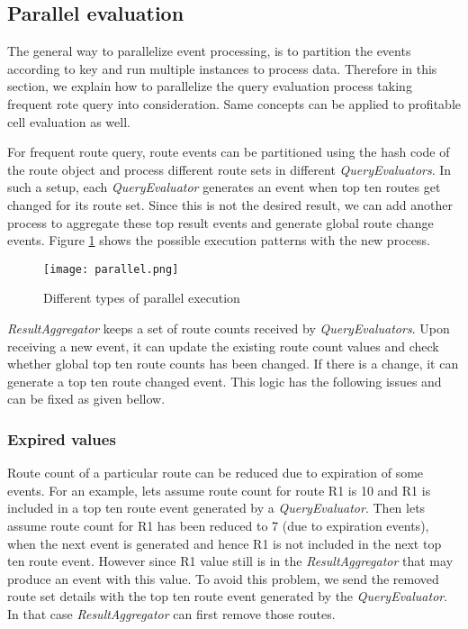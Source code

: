 \subsection{Parallel evaluation}
The general way to parallelize event processing, is to partition the events according to key and run multiple instances to process data. Therefore in this section, we explain how to parallelize the query evaluation process taking frequent rote query into consideration. Same concepts can be applied to profitable cell evaluation as well.

For frequent route query, route events can be partitioned using the hash code of the route object and process different route sets in different \textit{QueryEvaluators}. In such a setup, each \textit{QueryEvaluator} generates an event when top ten routes get changed for its route set. Since this is not the desired result, we can add another process to aggregate these top result events and generate global route change events. Figure \ref{parallel} shows the possible execution patterns with the new process.

\begin{figure}[!t]
        \centering
        \texttt{[image: parallel.png]}
        \caption{Different types of parallel execution}
        \label{parallel}
\end{figure}

\textit{ResultAggregator} keeps a set of route counts received by \textit{QueryEvaluators}. Upon receiving a new event, it can update the existing route count values and check whether global top ten route counts has been changed. If there is a change, it can generate a top ten route changed event. This logic has the following issues and can be fixed as given bellow.

\subsubsection{Expired values}
Route count of a particular route can be reduced due to expiration of some events. For an example, lets assume route count for route R1 is 10 and R1 is included in a top ten route event generated by a \textit{QueryEvaluator}. Then lets assume route count for R1 has been reduced to 7 (due to expiration events), when the next event is generated and hence R1 is not included in the next top ten route event. However since R1 value still is in the \textit{ResultAggregator} that may produce an event with this value. To avoid this problem, we send the removed route set details with the top ten route event generated by the \textit{QueryEvaluator}. In that case \textit{ResultAggregator} can first remove those routes.
